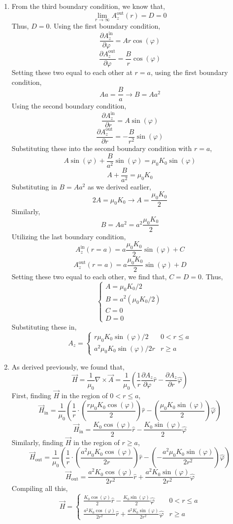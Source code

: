 \documentclass[12pt]{article}
\begin{document}
\begin{enumerate}
\begin{enumerate}
		\item [c.]
		From the third boundary condition, we know that,
		\[\lim_{r\to\infty}A_z^{\mathrm{out}}(r) = D = 0\]
		Thus, $D=0$.
		Using the first boundary condition,
		\[\frac{\partial A_z^{\mathrm{in}}}{\partial \varphi}=Ar\cos(\varphi)\]
		\[\frac{\partial A_z^{\mathrm{out}}}{\partial \varphi}=\frac{B}{r}\cos(\varphi)\]
		Setting these two equal to each other at $r=a$, using the first boundary condition,
		\[Aa=\frac{B}{a}\to B=Aa^2\]
		Using the second boundary condition,
		\[\frac{\partial A_z^{\mathrm{in}}}{\partial r}=A\sin(\varphi)\]
		\[\frac{\partial A_z^{\mathrm{out}}}{\partial r}=-\frac{B}{r^2}\sin(\varphi)\]
		Substituting these into the second boundary condition with $r=a$,
		\[A\sin(\varphi)+\frac{B}{a^2}\sin(\varphi)=\mu_0K_0\sin(\varphi)\]
		\[A+\frac{B}{a^2}=\mu_0K_0\]
		Substituting in $B=Aa^2$ as we derived earlier,
		\[2A=\mu_0K_0\to A = \frac{\mu_0K_0}{2}\]
		Similarly,
		\[B=Aa^2=a^2\frac{\mu_0K_0}{2}\]
		Utilizing the last boundary condition,
		\[A_z^{\mathrm{in}}(r=a) = a\frac{\mu_0K_0}{2}\sin(\varphi)+C\]
		\[A_z^{\mathrm{out}}(r=a) = a\frac{\mu_0K_0}{2}\sin(\varphi)+D\]
		Setting these two equal to each other, we find that, $C=D=0$.
		Thus,
		\[\boxed{\begin{cases}
			A = \mu_0K_0/2 \\
			B = a^2(\mu_0K_0/2) \\
			C = 0 \\ 
			D = 0	
		\end{cases}}\]
		Substituting these in,
		\[\boxed{A_z = \begin{cases}
			r\mu_0K_0\sin(\varphi)/2 & 0 < r \leq a \\ 
			a^2\mu_0K_0\sin(\varphi)/2r & r \geq a
		\end{cases}}\]

		\item [d.]
		As derived previously, we found that,
		\[\vec H = \frac{1}{\mu_0}\nabla \times \vec A = \frac{1}{\mu_0}\left(\frac{1}{r}\frac{\partial A_z}{\partial \varphi}\hat r - \frac{\partial A_z}{\partial r}\hat \varphi\right)\]
		First, finding $\vec H$ in the region of $0< r \leq a$,
		\[\vec H_{\mathrm{in}}=\frac{1}{\mu_0}\left(\frac{1}{r}\cdot\left(\frac{r\mu_0K_0\cos(\varphi)}{2}\right)\hat r - \left(\frac{\mu_0K_0\sin(\varphi)}{2}\right)\hat \varphi\right)\]
		\[\vec H_{\mathrm{in}} =\frac{K_0\cos(\varphi)}{2}\hat r  - \frac{K_0\sin(\varphi)}{2}\hat \varphi\]
		Similarly, finding $\vec H$ in the region of $r\geq a$,
		\[\vec H_{\mathrm{out}} = \frac{1}{\mu_0}\left(\frac{1}{r}\cdot\left(\frac{a^2\mu_0K_0\cos(\varphi)}{2r}\right)\hat r-\left(-\frac{a^2\mu_0K_0\sin(\varphi)}{2r^2}\right)\hat \varphi\right)\]
		\[\vec H_{\mathrm{out}}=\frac{a^2K_0\cos(\varphi)}{2r^2}\hat r+\frac{a^2K_0\sin(\varphi)}{2r^2}\hat \varphi\]
		Compiling all this,
		\[\boxed{\vec H  = \begin{cases}
			\frac{K_0\cos(\varphi)}{2}\hat r  - \frac{K_0\sin(\varphi)}{2}\hat \varphi & 0 < r \leq a \\ 
			\frac{a^2K_0\cos(\varphi)}{2r^2}\hat r+\frac{a^2K_0\sin(\varphi)}{2r^2}\hat \varphi & r \geq a
		\end{cases}}\]


\end{enumerate}
\end{enumerate}
\end{document}
